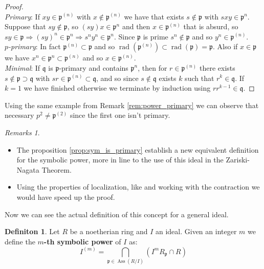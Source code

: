 \documentclass[a4wide]{book}
\theoremstyle{plain}
\theoremstyle{remark}
\newtheorem{rems}[rem]{Remarks}
\theoremstyle{definition}
\newtheorem{deff}[teo]{Definiton}
\newcommand{\p}{\mathfrak{p}}
\newcommand{\q}{\mathfrak{q}}
\DeclareMathOperator{\rad}{rad}
\DeclareMathOperator{\Ass}{Ass}
\begin{document}
	\begin{proof}\quad \\
		\textit{Primary}: If $ xy \in  \p^{(n)}$ with $ x \not \in  \p^{(n)}$ we have that exists $ s \not \in \p $ with $ sxy \in \p^n $. Suppose that $ sy \not \in \p $, so $ (sy)x \in \p^n $ and then $ x \in \p^{(n)} $ that is absurd, so $ sy \in \p \Rightarrow (sy)^n \in \p^n \Rightarrow s^n y^n \in \p^n$. Since $ \p $ is prime $ s^n \not \in \p $ and so $ y^n \in \p^{(n)} $. \\
		\textit{$p$-primary}: In fact $ \p^{(n)} \subset \p $ and so $  \rad  (\p^{(n)} )\subset \rad (\p) = \p$. Also if $ x \in \p $ we have $ x^n \in \p^n \subset \p^{(n)}  $ and so $ x \in \p^{(n)}  $.\\
		\textit{Minimal}: If $ \q $ is $ \p $-primary and contains $ \p^n $, then for $ r \in \p^{(n)}  $ there exists $ s \not \in \p \supset \q $ with $ sr \in \p^{(n)}  \subset \q $, and so since $ s \not \in \q  $ exists $ k $ such that $ r^k \in \q $. If $ k=1 $ we have finished otherwise we terminate by induction using $ r r^{k-1} \in \q $.
	\end{proof}
	Using the same example from Remark \ref{rem:power_primary} we can observe that necessary $ p^2 \neq \p^{(2)}  $ since the first one isn't primary. 
	
	\begin{rems}
		\begin{itemize}
		\item The proposition \ref{prop:sym_is_primary} establish a new equivalent definition for the symbolic power, more in line to the use of this ideal in the Zariski-Nagata Theorem.
		\item Using the properties of localization, like \cite[Proposition 4.8]{AMCD} and working with the contraction we would have speed up the proof.
		\end{itemize}
	\end{rems}
	
Now we can see the actual definition of this concept for a general ideal.

\begin{deff}
	Let $ R $ be a noetherian ring and $ I $ an ideal. Given an integer $ m $ we define the \textbf{$ m $-th symbolic power} of $ I $ as:
	\begin{equation}\label{eq:sym_pow_def}
		I^{(m)} = \bigcap_{\p \in \Ass(R/I) } (I^m R_\p \cap R)
	\end{equation}
\end{deff}
\end{document}
